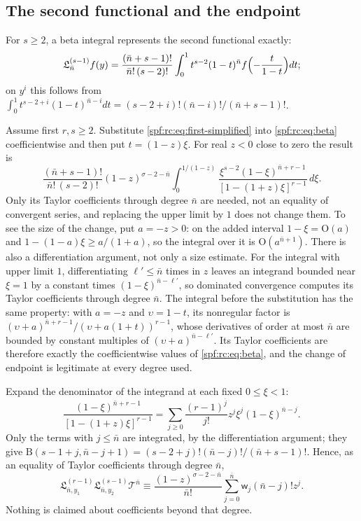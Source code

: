 \documentclass[11pt]{article}
\numberwithin{equation}{section}
\theoremstyle{definition}
\theoremstyle{remark}
\theoremstyle{definition}
\newcommand{\rise}[2]{{#1}^{\overline{#2}}}
\newcommand{\bigO}{\mathrm O}
\newcommand{\rcw}{\mathsf w}
\begin{document}
\subsection{The second functional and the endpoint}

For $s\ge2$, a beta integral represents the second functional exactly:
\begin{equation}
 \mathfrak L_{\bar n}^{(s-1)}f(y)=
 \frac{(\bar n+s-1)!}{\bar n!\,(s-2)!}
 \int_0^1 t^{s-2}(1-t)^{\bar n} f\Bigl(-\frac{t}{1-t}\Bigr)dt;
 \label{spf:rc:eq:beta}
\end{equation}
on $y^i$ this follows from
$\int_0^1t^{s-2+i}(1-t)^{\bar n-i}dt=(s-2+i)!(\bar n-i)!/(\bar n+s-1)!$.

Assume first $r,s\ge2$. Substitute \eqref{spf:rc:eq:first-simplified} into
\eqref{spf:rc:eq:beta} coefficientwise and then put $t=(1-z)\xi$. For real
$z<0$ close to zero the result is
\begin{equation}
 \frac{(\bar n+s-1)!}{\bar n!\,(s-2)!}(1-z)^{\sigma-2-\bar n}
 \int_0^{1/(1-z)}
       \frac{\xi^{s-2}(1-\xi)^{\bar n+r-1}}{[1-(1+z)\xi]^{r-1}}\,d\xi.
 \label{spf:rc:eq:beta-transformed}
\end{equation}
Only its Taylor coefficients through degree $\bar n$ are needed, not an
equality of convergent series, and replacing the upper limit by $1$ does
not change them. To see the size of the change, put $a=-z>0$: on the added
interval $1-\xi=\bigO(a)$ and $1-(1-a)\xi\ge a/(1+a)$, so the integral over
it is $\bigO(a^{\bar n+1})$. There is also a differentiation argument, not
only a size estimate. For the integral with upper limit $1$, differentiating
$\ell'\le\bar n$ times in $z$ leaves an integrand bounded near $\xi=1$ by a
constant times $(1-\xi)^{\bar n-\ell'}$, so dominated convergence computes
its Taylor coefficients through degree $\bar n$. The integral before the
substitution has the same property: with $a=-z$ and $\upsilon=1-t$, its
nonregular factor is $(\upsilon+a)^{\bar n+r-1}/(\upsilon+a(1+t))^{r-1}$, whose
derivatives of order at most $\bar n$ are bounded by constant multiples of
$(\upsilon+a)^{\bar n-\ell'}$. Its Taylor coefficients are therefore exactly the
coefficientwise values of \eqref{spf:rc:eq:beta}, and the change of endpoint
is legitimate at every degree used.

Expand the denominator of the integrand at each fixed $0\le\xi<1$:
\begin{equation}
 \frac{(1-\xi)^{\bar n+r-1}}{[1-(1+z)\xi]^{r-1}}
 =\sum_{j\ge0}\frac{\rise{(r-1)}j}{j!}z^j\xi^j(1-\xi)^{\bar n-j}.
\end{equation}
Only the terms with $j\le\bar n$ are integrated, by the differentiation
argument; they give
$\mathrm B(s-1+j,\bar n-j+1)=(s-2+j)!(\bar n-j)!/(\bar n+s-1)!$. Hence, as an
equality of Taylor coefficients through degree $\bar n$,
\begin{equation}
 \mathfrak L_{\bar n,y_1}^{(r-1)}\mathfrak L_{\bar n,y_2}^{(s-1)}\mathcal T^{\bar n}
 \equiv\frac{(1-z)^{\sigma-2-\bar n}}{\bar n!}
                 \sum_{j=0}^{\bar n}\rcw_j(\bar n-j)!z^j.
 \label{spf:rc:eq:double-functional}
\end{equation}
Nothing is claimed about coefficients beyond that degree.
\end{document}
